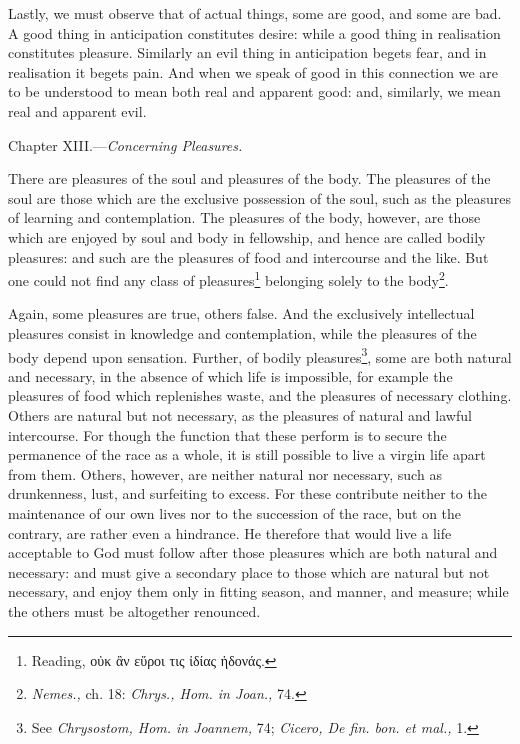 Lastly, we must observe that of actual things, some are good, and some are bad. A good thing in anticipation constitutes desire: while a good thing in realisation constitutes pleasure. Similarly an evil thing in anticipation begets fear, and in realisation it begets pain. And when we speak of good in this connection we are to be understood to mean both real and apparent good: and, similarly, we mean real and apparent evil.


Chapter XIII.—\emph{Concerning Pleasures.}

There are pleasures of the soul and pleasures of the body. The pleasures of the soul are those which are the exclusive possession of the soul, such as the pleasures of learning and contemplation. The pleasures of the body, however, are those which are enjoyed by soul and body in fellowship, and hence are called bodily pleasures: and such are the pleasures of food and intercourse and the like. But one could not find any class of pleasures\footnote{Reading, \textgreek{οὐκ ἂν εὕροι τις ἰδίας ἡδονάς}.} belonging solely to the body\footnote{\emph{Nemes.,} ch. 18: \emph{Chrys., Hom. in Joan., }74.}.

Again, some pleasures are true, others false. And the exclusively intellectual pleasures consist in knowledge and contemplation, while the pleasures of the body depend upon sensation. Further, of bodily pleasures\footnote{See \emph{Chrysostom, Hom. in Joannem, }74; \emph{Cicero, De fin. bon. et mal., }1.}, some are both natural and necessary, in the absence of which life is impossible, for example the pleasures of food which replenishes waste, and the pleasures of necessary clothing. Others are natural but not necessary, as the pleasures of natural and lawful intercourse. For though the function that these perform is to secure the permanence of the race as a whole, it is still possible to live a virgin life apart from them. Others, however, are neither natural nor necessary, such as drunkenness, lust, and surfeiting to excess. For these contribute neither to the maintenance of our own lives nor to the succession of the race, but on the contrary, are rather even a hindrance. He therefore that would live a life acceptable to God must follow after those pleasures which are both natural and necessary: and must give a secondary place to those which are natural but not necessary, and enjoy them only in fitting season, and manner, and measure; while the others must be altogether renounced.

